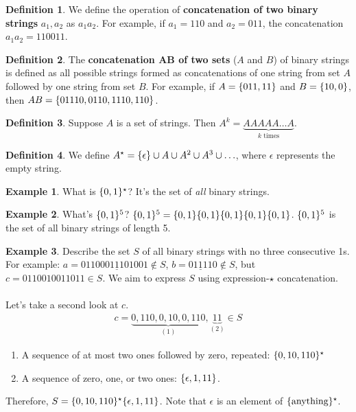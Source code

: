 \documentclass[]{article}
\theoremstyle{definition}
\newtheorem*{defn}{Definition}
\newtheorem{ex}{Example}[section]
\DeclarePairedDelimiter{\set}{\lbrace}{\rbrace}
\begin{document}
		\begin{defn}
			We define the operation of \textbf{concatenation of two binary strings} $a_1, a_2$ as $a_1 a_2$. For example, if $a_1 = 110$ and $a_2 = 011$, the concatenation $a_1 a_2 = 110011$.
		\end{defn}

		\begin{defn}
			The \textbf{concatenation $\mathbf{AB}$ of two sets} ($A$ and $B$) of binary strings is defined as all possible strings formed as concatenations of one string from set $A$ followed by one string from set $B$. For example, if $A = \set{011, 11 }$ and $B = \set{10, 0}$, then $AB = \set{01110, 0110, 1110, 110 }$.
		\end{defn}

		\begin{defn}
			Suppose $A$ is a set of strings. Then $A^k = \underbrace{AAAAA \ldots A}_{k \text{ times}}$.
		\end{defn}

		\begin{defn}
			We define $A^\star = \set{\epsilon } \cup A \cup A^2 \cup A^3 \cup \ldots$, where $\epsilon$ represents the empty string.
		\end{defn}

		\begin{ex}
			What is $\set{0, 1 }^\star$? It's the set of \emph{all} binary strings.
		\end{ex}

		\begin{ex}
			What's $\set{0, 1 }^5$? $\set{0, 1 }^5 = \set{0, 1 } \set{0, 1 } \set{0, 1 } \set{0, 1 } \set{0, 1 }$. $\set{0, 1}^5$ is the set of all binary strings of length 5.
		\end{ex}

		\begin{ex}
			Describe the set $S$ of all binary strings with no three consecutive 1s. For example: $a = 011000\underline{111}01001 \not \in S$, $b = 0\underline{111}10 \not \in S$, but $c = 0110010011011 \in S$. We aim to express $S$ using expression-$\star$ concatenation.
			\\ \\
			Let's take a second look at $c$.
			\begin{align*}
				c = \underbrace{0,110,0,10,0,110}_{(1)},\underbrace{11}_{(2)} \in S
			\end{align*}
			
			\begin{enumerate}
				\item A sequence of at most two ones followed by zero, repeated: $\set{0, 10, 110 }^\star$
				\item A sequence of zero, one, or two ones: $\set{\epsilon, 1, 11 }$.
			\end{enumerate}

			Therefore, $S = \set{0, 10, 110}^\star \set{\epsilon, 1, 11 }$. Note that $\epsilon$ is an element of $\set{\text{anything} }^\star$.
		\end{ex}
\end{document}
